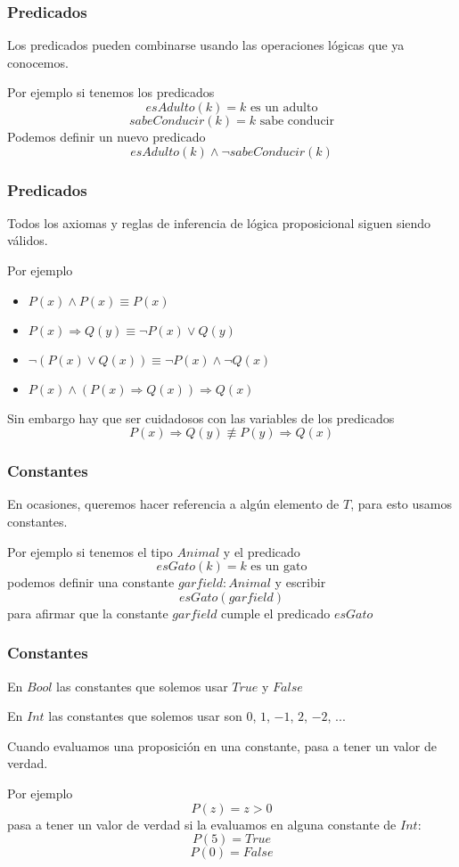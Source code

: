 \documentclass{beamer}
\newcommand{\then}{\Rightarrow}
\begin{document}
\begin{frame}[fragile]
    \frametitle{Predicados}
        \pause
        Los predicados pueden combinarse usando las operaciones lógicas que ya conocemos.
        \pause

        Por ejemplo si tenemos los predicados
        \pause
        $$esAdulto(k) = k\text{ es un adulto}$$
        \pause
        $$sabeConducir(k) = k\text{ sabe conducir}$$
        \pause
        Podemos definir un nuevo predicado
        \pause
        $$esAdulto(k) \land \lnot sabeConducir(k)$$
\end{frame}
\begin{frame}[fragile]
    \frametitle{Predicados}
        \pause
        Todos los axiomas y reglas de inferencia de lógica proposicional siguen siendo válidos.
        \pause

        Por ejemplo
        \begin{itemize}
            \pause
            \item $P(x) \land P(x) \equiv P(x)$
            \pause
            \item $P(x) \then Q(y) \equiv \lnot P(x) \lor Q(y)$
            \pause
            \item $\lnot(P(x) \lor Q(x)) \equiv \lnot P(x) \land \lnot Q(x)$
            \pause
            \item $P(x) \land (P(x) \then Q(x)) \then Q(x)$
        \end{itemize}
        \pause
        Sin embargo hay que ser cuidadosos con las variables de los predicados
        \pause
        $$P(x) \then Q(y) \not \equiv P(y) \then Q(x)$$
\end{frame}

\begin{frame}[fragile]
    \frametitle{Constantes}
        \pause
        En ocasiones, queremos hacer referencia a algún elemento de $T$, para esto usamos constantes.
        \pause

        Por ejemplo si tenemos el tipo $Animal$ y el predicado
        \pause
        $$esGato(k) = k\text{ es un gato}$$
        \pause
        podemos definir una constante $garfield: Animal$ y escribir
        \pause
        $$esGato(garfield)$$
        \pause
        para afirmar que la constante $garfield$ cumple el predicado $esGato$
\end{frame}

\begin{frame}[fragile]
    \frametitle{Constantes}
        \pause 
        En $Bool$ las constantes que solemos usar $True$ y $False$
        
        \pause
        En $Int$ las constantes que solemos usar son $0$, $1$, $-1$, $2$, $-2$, ...
        
        \pause
        Cuando evaluamos una proposición en una constante, pasa a tener un valor de verdad. 
        
        \pause
        Por ejemplo
        $$P(z) = z > 0$$
        \pause
        pasa a tener un valor de verdad si la evaluamos en alguna constante de $Int$:
        $$P(5) = True$$
        $$P(0) = False$$
\end{frame}
\end{document}
